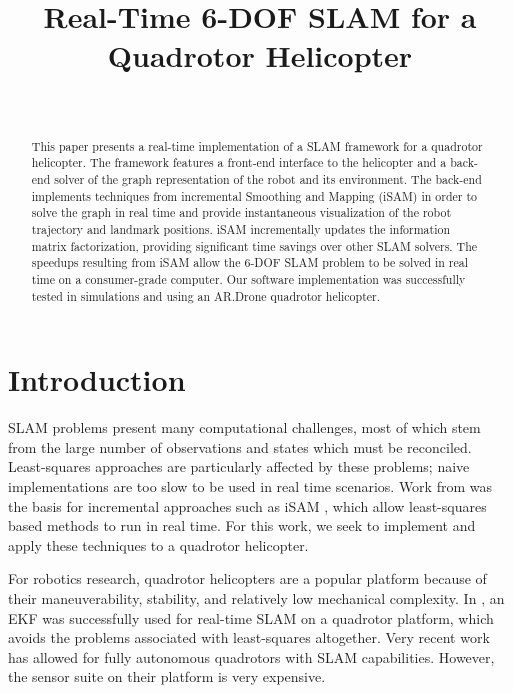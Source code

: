 \documentclass[conference]{IEEEtran}
\title{Real-Time 6-DOF SLAM for a Quadrotor Helicopter}
\author{\IEEEauthorblockN{Stephen Chaves\ \ \ \ \  Schuyler Cohen\ \ \ \ \  Patrick
     O'Keefe\ \ \ \ \  Paul Ozog}\\
   \IEEEauthorblockA{University of Michigan}
}
\begin{document}
\maketitle



\begin{abstract}

  This paper presents a real-time implementation of a \ac{SLAM} framework for a quadrotor
  helicopter.  The framework features a front-end interface to the helicopter and a
  back-end solver of the graph representation of the robot and its environment. The
  back-end implements techniques from incremental Smoothing and Mapping (iSAM) in order to
  solve the graph in real time and provide instantaneous visualization of the robot
  trajectory and landmark positions. iSAM incrementally updates the information matrix
  factorization, providing significant time savings over other \ac{SLAM} solvers. The speedups
  resulting from iSAM allow the 6-\ac{DOF} \ac{SLAM} problem to be solved in real time on a
  consumer-grade computer. Our software implementation was successfully tested in simulations
  and using an AR.Drone quadrotor helicopter.

\end{abstract}






\section{Introduction}
\label{sec:introduction}


\ac{SLAM} problems present many computational challenges, most of which stem from the
large number of observations and states which must be reconciled. Least-squares approaches
are particularly affected by these problems; naive implementations are too slow to be used
in real time scenarios. Work from \cite{dellaert2005square} was the basis for incremental
approaches such as iSAM \cite{Kaess08tro}, which allow least-squares based methods to run
in real time. For this work, we seek to implement and apply these techniques to a quadrotor
helicopter.


For robotics research, quadrotor helicopters are a popular platform because of their
maneuverability, stability, and relatively low mechanical complexity. In
\cite{achtelik2008autonomous}, an \ac{EKF} was successfully used for real-time \ac{SLAM} on
a quadrotor platform, which avoids the problems associated with least-squares altogether. Very
recent work \cite{ghadiok2011autonomous} has allowed for fully autonomous quadrotors with
SLAM capabilities. However, the sensor suite on their platform is very expensive.
\end{document}
